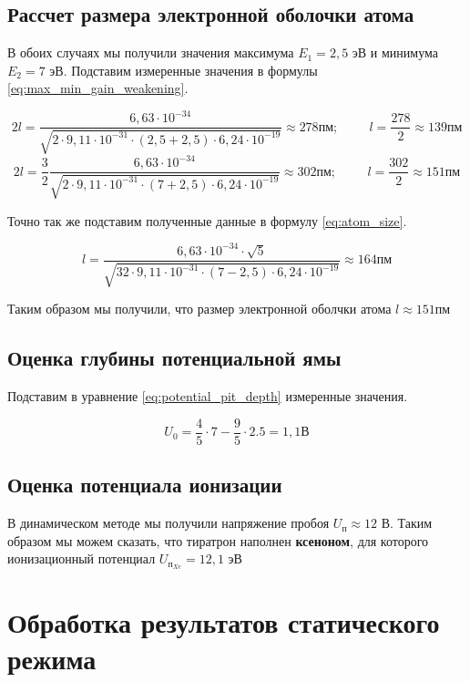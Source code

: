 \documentclass[12pt]{article}
\begin{document}
    \subsection{Рассчет размера электронной оболочки атома}

      В обоих случаях мы получили значения максимума $E_1 = 2,5$ эВ и
      минимума $E_2 = 7$ эВ. Подставим измеренные значения в формулы
      \ref{eq:max_min_gain_weakening}.

      $$
        2 l = \frac{6,63 \cdot 10^{-34}}{\sqrt{2 \cdot 9,11 \cdot 10^{-31} \cdot
        \left( 2,5 + 2,5 \right) \cdot 6,24 \cdot 10^{-19}}} \approx 278 пм;
        \hspace{1cm} l = \frac{278}{2} \approx 139 пм
      $$
      $$
        2 l = \frac{3}{2} \frac{6,63 \cdot 10^{-34}}{\sqrt{2 \cdot 9,11 \cdot
        10^{-31} \cdot \left( 7 + 2,5 \right) \cdot 6,24 \cdot 10^{-19}}}
        \approx 302 пм; \hspace{1cm} l = \frac{302}{2} \approx 151 пм
      $$

      Точно так же подставим полученные данные в формулу \ref{eq:atom_size}.

      $$
        l = \frac{6,63 \cdot 10^{-34} \cdot \sqrt{5}}{\sqrt{32 \cdot 9,11 \cdot
        10^{-31} \cdot \left( 7 - 2,5 \right) \cdot 6,24 \cdot 10^{-19}}}
        \approx 164 пм
      $$

      Таким образом мы получили, что размер электронной оболчки атома $l
      \approx 151 пм$

    \subsection{Оценка глубины потенциальной ямы}

      Подставим в уравнение \ref{eq:potential_pit_depth} измеренные значения.

      $$
        U_0 = \frac{4}{5} \cdot 7 - \frac{9}{5} \cdot 2.5 = 1,1 В
      $$

    \subsection{Оценка потенциала ионизации}

      В динамическом методе мы получили напряжение пробоя $U_п \approx 12$ В.
      Таким образом мы можем сказать, что тиратрон наполнен \textbf{ксеноном},
      для которого ионизационный потенциал $U_{п_{Xe}} = 12,1$ эВ

  \section{Обработка результатов статического режима}
\end{document}

